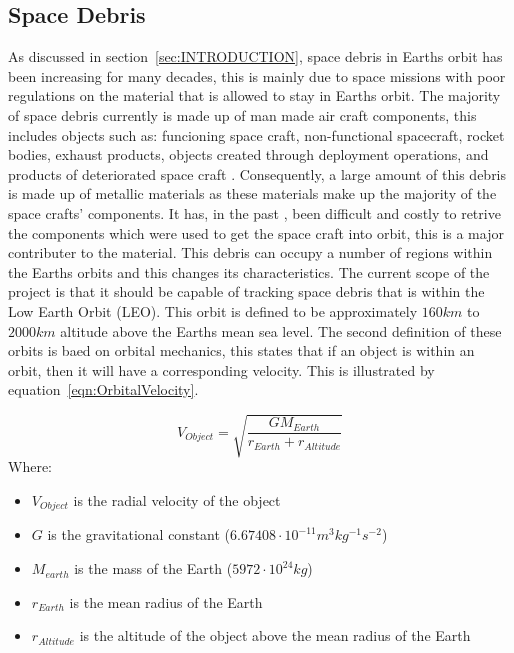 \documentclass[11pt]{witseiepaper}
\begin{document}
\subsection{Space Debris} \label{sec:SpaceDebris}
As discussed in section~\ref{sec:INTRODUCTION}, space debris in Earths orbit has been increasing for many decades, this is mainly due to space missions with poor regulations on the material that is allowed to stay in Earths orbit.
The majority of space debris currently is made up of man made air craft components, this includes objects such as: funcioning space craft, non-functional spacecraft, rocket bodies, exhaust products, objects created through deployment operations, and products of deteriorated space craft \cite{OrbitalDebrisTechnicalAssessment}.
Consequently, a large amount of this debris is made up of metallic materials as these materials make up the majority of the space crafts' components.
It has, in the past \cite{Spacex}, been difficult and costly to retrive the components which were used to get the space craft into orbit, this is a major contributer to the material.
This debris can occupy a number of regions within the Earths orbits and this changes its characteristics.
The current scope of the project is that it should be capable of tracking space debris that is within the Low Earth Orbit (LEO). This orbit is defined to be approximately $160 km$ to $2000 km$ altitude above the Earths mean sea level.
The second definition of these orbits is baed on orbital mechanics, this states that if an object is within an orbit, then it will have a corresponding velocity.
This is illustrated by equation~\ref{eqn:OrbitalVelocity}. 

\begin{equation}
    V_{Object} = \sqrt{\frac{G M_{Earth}}{r_{Earth} + r_{Altitude}}}
\end{equation}
Where:
\begin{itemize}
    \item $V_{Object}$ is the radial velocity of the object
    \item $G$ is the gravitational constant ($6.67408 \cdot 10^{-11} m^3 kg^{-1} s^{-2}$)
    \item $M_{earth}$ is the mass of the Earth ($5972 \cdot 10^{24} kg$)
    \item $r_{Earth}$ is the mean radius of the Earth
    \item $r_{Altitude}$ is the altitude of the object above the mean radius of the Earth
\end{itemize}
\end{document}
